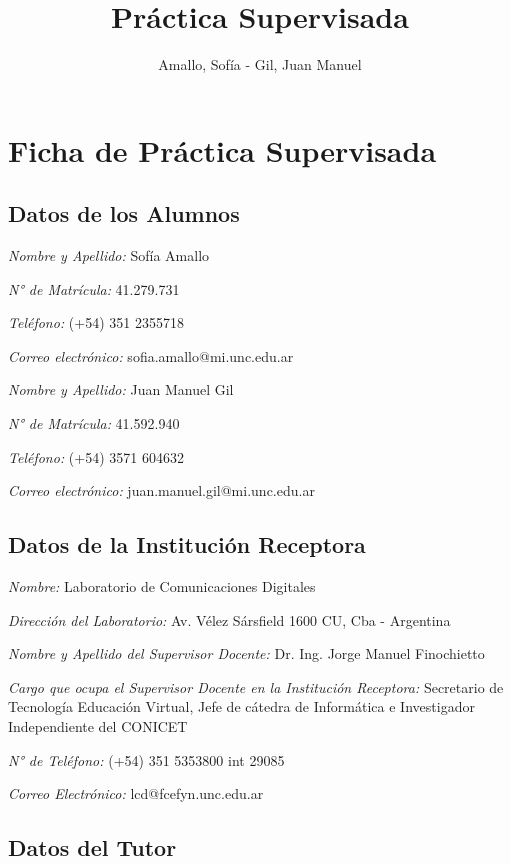 \documentclass[12pt]{article}
\title{\huge Práctica Supervisada\vspace*{5cm}}
\author{Amallo, Sofía - Gil, Juan Manuel}
\date{\parbox{\linewidth}{\centering%
  Noviembre 18, 2022 \endgraf\bigskip
  \vspace*{4cm}
  Dr. Ing. Horacio A. Mendoza \hspace*{1cm} Dr. Ing. Jorge Finochietto\endgraf\medskip
  \vspace*{0.5cm}
  Laboratorio de\ Comunicaciones Digitales \endgraf
  Universidad Nacional de Córdoba}}
\begin{document}
\maketitle
\thispagestyle{empty}
\newpage

\markright{}

\section{Ficha de Práctica Supervisada}
\subsection{Datos de los Alumnos}
\raggedright
\textsl{Nombre y Apellido:}  Sofía Amallo

\textsl{N° de Matrícula:} 41.279.731

\textsl{Teléfono:} (+54) 351 2355718

\textsl{Correo electrónico:} sofia.amallo@mi.unc.edu.ar
\vspace*{0.5cm}

\textsl{Nombre y Apellido:} Juan Manuel Gil

\textsl{N° de Matrícula:} 41.592.940

\textsl{Teléfono:} (+54) 3571 604632

\textsl{Correo electrónico:} juan.manuel.gil@mi.unc.edu.ar

\subsection{Datos de la Institución Receptora}
\textsl{Nombre:} Laboratorio de Comunicaciones Digitales

\textsl{Dirección del Laboratorio:} Av. Vélez Sársfield 1600 CU, Cba - Argentina

\textsl{Nombre y Apellido del Supervisor Docente:} Dr. Ing. Jorge Manuel Finochietto

\textsl{Cargo que ocupa el Supervisor Docente en la Institución Receptora:} Secretario de Tecnología  Educación Virtual, Jefe de cátedra de Informática e Investigador Independiente del CONICET

\textsl{N° de Teléfono:} (+54) 351 5353800 int 29085

\textsl{Correo Electrónico:} lcd@fcefyn.unc.edu.ar

\subsection{Datos del Tutor}
\end{document}
